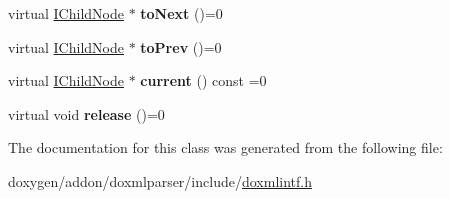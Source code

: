 \begin{DoxyCompactItemize}
\mbox{\label{class_i_child_node_iterator_a7b84531dde02554cc105b0cbaea84b7a}} 
virtual \mbox{\hyperlink{class_i_child_node}{I\+Child\+Node}} $\ast$ {\bfseries to\+Next} ()=0
\item 
\mbox{\label{class_i_child_node_iterator_ae11de8e2b0d849b41d3608258a88b332}} 
virtual \mbox{\hyperlink{class_i_child_node}{I\+Child\+Node}} $\ast$ {\bfseries to\+Prev} ()=0
\item 
\mbox{\label{class_i_child_node_iterator_afb1d19f071c269ab1cf4584a9ddf740d}} 
virtual \mbox{\hyperlink{class_i_child_node}{I\+Child\+Node}} $\ast$ {\bfseries current} () const =0
\item 
\mbox{\label{class_i_child_node_iterator_a85114d69ba9f1d47e87208aaf72b91ab}} 
virtual void {\bfseries release} ()=0
\end{DoxyCompactItemize}


The documentation for this class was generated from the following file\+:\begin{DoxyCompactItemize}
\item 
doxygen/addon/doxmlparser/include/\mbox{\hyperlink{include_2doxmlintf_8h}{doxmlintf.\+h}}\end{DoxyCompactItemize}
